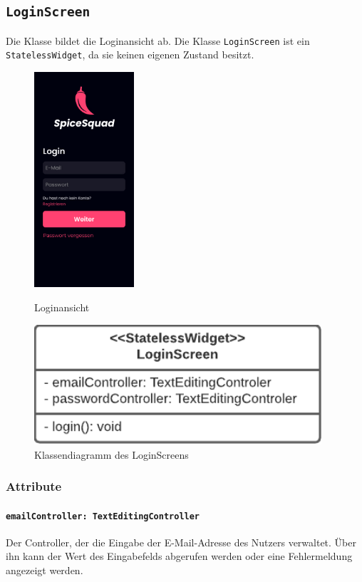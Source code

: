 \documentclass{entwurfsheft}
\begin{document}
\subsection{\texttt{LoginScreen}}
\label{sec:loginScreen}
Die Klasse bildet die Loginansicht ab. Die Klasse \texttt{LoginScreen} ist ein \texttt{StatelessWidget}, da sie keinen eigenen Zustand besitzt.
\begin{figure}[htp]
    \begin{minipage}
        [t]{0.49\textwidth}
        \centering
        \includegraphics[height=80mm]{images/presentationLayer/uiElements/loginScreen.jpg}
        \caption{Loginansicht}
    \end{minipage}
    \begin{minipage}
        [t]{0.49\textwidth}
        \centering
        \includegraphics[width=0.95\textwidth]{images/presentationLayer/classDiagrams/loginScreen.pdf}
        \caption{Klassendiagramm des Login\-Screens}
    \end{minipage}
\end{figure}
\subsubsection*{Attribute}
\paragraph{\texttt{emailController: TextEditingController}}
Der Controller, der die Eingabe der E-Mail-Ad\-resse des Nutzers verwaltet. Über ihn kann der Wert des Eingabefelds abgerufen werden oder eine Fehlermeldung angezeigt werden.
\end{document}
